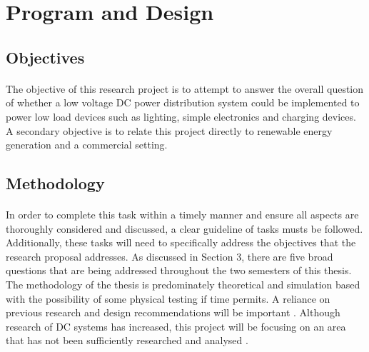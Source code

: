 \section{Program and Design}  


\subsection{Objectives}

\paragraph{}
The objective of this research project is to attempt to answer the overall question of whether a low voltage DC power distribution system could be implemented to power low load devices such as lighting, simple electronics and charging devices. A secondary objective is to relate this project directly to renewable energy generation and a commercial setting.

\subsection{Methodology}

\paragraph{}
In order to complete this task within a timely manner and ensure all aspects are thoroughly considered and discussed, a clear guideline of tasks musts be followed. Additionally, these tasks will need to specifically address the objectives that the research proposal addresses. As discussed in Section 3, there are five broad questions that are being addressed throughout the two semesters of this thesis. The methodology of the thesis is predominately theoretical and simulation based with the possibility of some physical testing if time permits. A reliance on previous research and design recommendations will be important \cite{Amin2011}. Although research of DC systems has increased, this project will be focusing on an area that has not been sufficiently researched and analysed \cite{Pellis1997}.   

